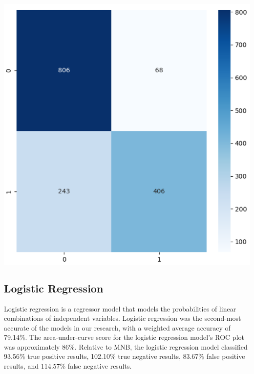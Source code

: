 \documentclass[11pt]{article}
\begin{document}
\begin{minipage}[b]{.45\linewidth}
\includegraphics[width=\linewidth]{images/rf_heatmap.png}
\end{minipage}\hfill

\subsection{Logistic Regression}

Logistic regression is a regressor model that models the probabilities of linear combinations of independent variables. Logistic regression was the second-most accurate of the models in our research, with a weighted average accuracy of 79.14\%. The area-under-curve score for the logistic regression model's ROC plot was approximately 86\%. Relative to MNB, the logistic regression model classified 93.56\% true positive results, 102.10\% true negative results, 83.67\% false positive results, and 114.57\% false negative results.
\end{document}
